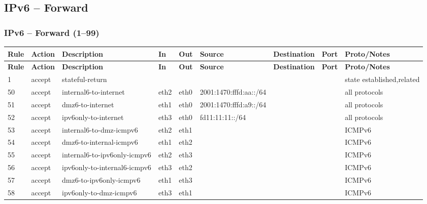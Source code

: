 \documentclass[a4paper,11pt]{article}
\begin{document}
\begin{landscape}
\subsection{IPv6 -- Forward}
\subsubsection{IPv6 -- Forward (1--99)}
\begin{longtable}{|l|l|l|l|l|l|l|p{2.2cm}|l|}
\hline
\textbf{Rule} & \textbf{Action} & \textbf{Description} & \textbf{In} & \textbf{Out} & \textbf{Source} & \textbf{Destination} & \textbf{Port} & \textbf{Proto/Notes} \\
\hline
\endfirsthead
\hline
\textbf{Rule} & \textbf{Action} & \textbf{Description} & \textbf{In} & \textbf{Out} & \textbf{Source} & \textbf{Destination} & \textbf{Port} & \textbf{Proto/Notes} \\
\hline
\endhead
1 & accept & stateful-return & & & & & & state established,related \\
50 & accept & internal6-to-internet & eth2 & eth0 & 2001:1470:fffd:aa::/64 & & & all protocols \\
51 & accept & dmz6-to-internet & eth1 & eth0 & 2001:1470:fffd:a9::/64 & & & all protocols \\
52 & accept & ipv6only-to-internet & eth3 & eth0 & fd11:11:11::/64 & & & all protocols \\
53 & accept & internal6-to-dmz-icmpv6 & eth2 & eth1 & & & & ICMPv6 \\
54 & accept & dmz6-to-internal-icmpv6 & eth1 & eth2 & & & & ICMPv6 \\
55 & accept & internal6-to-ipv6only-icmpv6 & eth2 & eth3 & & & & ICMPv6 \\
56 & accept & ipv6only-to-internal6-icmpv6 & eth3 & eth2 & & & & ICMPv6 \\
57 & accept & dmz6-to-ipv6only-icmpv6 & eth1 & eth3 & & & & ICMPv6 \\
58 & accept & ipv6only-to-dmz-icmpv6 & eth3 & eth1 & & & & ICMPv6 \\
\hline
\end{longtable}


\end{landscape}
\end{document}
